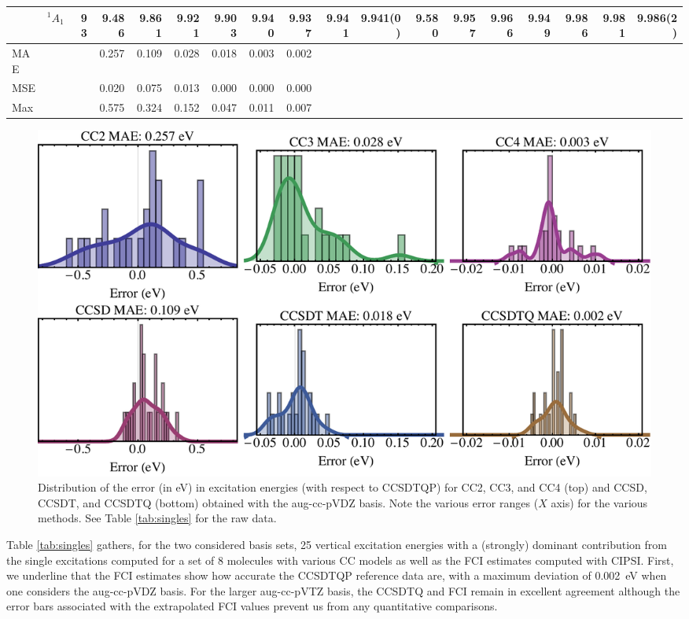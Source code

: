 \documentclass[aip,jcp,reprint,noshowkeys,superscriptaddress]{revtex4-1}
\begin{document}
\begin{squeezetable}
\begin{table}
\begin{ruledtabular}
\begin{tabular}{llrrrrrrrrrrrrrrrr}
				&	$^1A_1$  		&93	&9.486	&9.861	&9.921	&9.903	&9.940	&9.937	&9.941	&9.941(0)	&9.580	&9.957	&9.966	&9.949	&9.986	&9.981	&9.986(2)\\
	\hline
	MAE			&					&	&0.257	&0.109	&0.028	&0.018	&0.003	&0.002	\\
	MSE			&					&	&0.020	&0.075	&0.013	&0.000	&0.000	&0.000	\\
	Max			&					&	&0.575	&0.324	&0.152	&0.047	&0.011	&0.007	\\
	\end{tabular}
	\end{ruledtabular}
\end{table}
\end{squeezetable}

\begin{figure}
	\includegraphics[width=0.7\linewidth]{fig1}
	\caption{
	Distribution of the error (in eV) in excitation energies (with respect to CCSDTQP) for CC2, CC3, and CC4 (top) and CCSD, CCSDT, and CCSDTQ (bottom) obtained with the aug-cc-pVDZ basis.
	Note the various error ranges ($X$ axis) for the various methods.
	See Table \ref{tab:singles} for the raw data.
	\label{fig:error}}
\end{figure}

Table \ref{tab:singles} gathers, for the two considered basis sets, 25 vertical excitation energies with a (strongly) dominant contribution from the single excitations computed for a set of 8 molecules with various CC models as well as the FCI estimates computed with CIPSI.
First, we underline that the FCI estimates show how accurate the CCSDTQP reference data are, with a maximum deviation of \SI{0.002}{\eV} when one considers the aug-cc-pVDZ basis. 
For the larger aug-cc-pVTZ basis, the CCSDTQ and FCI remain in excellent agreement although the error bars associated with the extrapolated FCI values prevent us from any quantitative comparisons.
\end{document}
